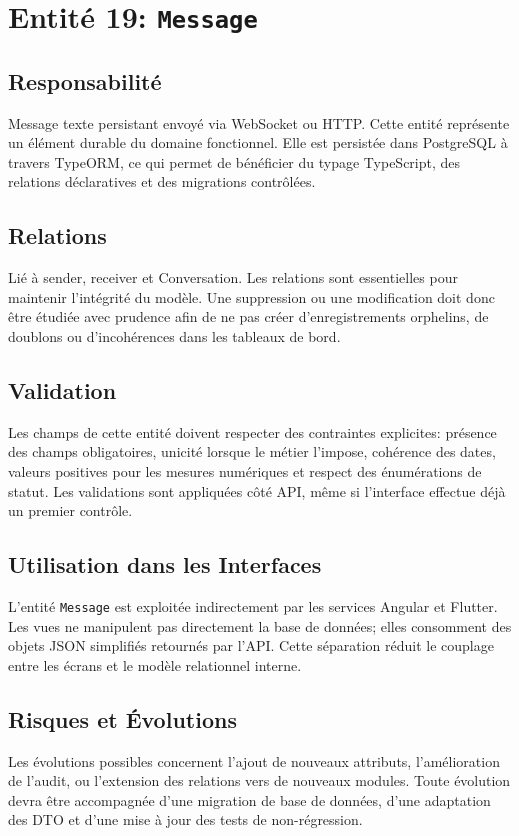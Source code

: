 \section{Entité 19: \texttt{Message}}
\subsection{Responsabilité}
Message texte persistant envoyé via WebSocket ou HTTP. Cette entité représente un élément durable du domaine fonctionnel. Elle est persistée dans PostgreSQL à travers TypeORM, ce qui permet de bénéficier du typage TypeScript, des relations déclaratives et des migrations contrôlées.

\subsection{Relations}
Lié à sender, receiver et Conversation. Les relations sont essentielles pour maintenir l'intégrité du modèle. Une suppression ou une modification doit donc être étudiée avec prudence afin de ne pas créer d'enregistrements orphelins, de doublons ou d'incohérences dans les tableaux de bord.

\subsection{Validation}
Les champs de cette entité doivent respecter des contraintes explicites: présence des champs obligatoires, unicité lorsque le métier l'impose, cohérence des dates, valeurs positives pour les mesures numériques et respect des énumérations de statut. Les validations sont appliquées côté API, même si l'interface effectue déjà un premier contrôle.

\subsection{Utilisation dans les Interfaces}
L'entité \texttt{Message} est exploitée indirectement par les services Angular et Flutter. Les vues ne manipulent pas directement la base de données; elles consomment des objets JSON simplifiés retournés par l'API. Cette séparation réduit le couplage entre les écrans et le modèle relationnel interne.

\subsection{Risques et Évolutions}
Les évolutions possibles concernent l'ajout de nouveaux attributs, l'amélioration de l'audit, ou l'extension des relations vers de nouveaux modules. Toute évolution devra être accompagnée d'une migration de base de données, d'une adaptation des DTO et d'une mise à jour des tests de non-régression.

